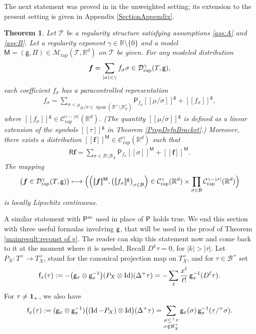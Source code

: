 \documentclass[11pt]{article}
\numberwithin{equation}{section}
\newcommand\mto{\mathchoice{\longmapsto}{\mapsto}{\mapsto}{\mapsto}}
\DeclareMathOperator{\Span}{span}
\theoremstyle{plain}
\newtheorem{thm}{Theorem}
\theoremstyle{definition}
\DeclareMathOperator{\iden}{Id}
\newcommand{\Brac}[1]{[\![#1]\!]}
\newcommand{\bsf}{\boldsymbol{f}}
\newcommand{\rap}{\mathrm{rap}}
\newcommand{\reR}{\boldsymbol{\mathsf{R}}}
\newcommand{\sfM}{\mathsf{M}}
\newcommand{\sfP}{\mathsf{P}}
\newcommand{\sff}{\mathsf{f}}
\newcommand{\sfg}{\mathsf{g}}
\newcommand{\sfPi}{\mathsf{\Pi}}
\newcommand{\scrM}{\mathscr{M}}
\newcommand{\scrT}{\mathscr{T}}
\newcommand{\bbR}{\mathbb{R}}
\newcommand{\mcB}{\mathcal{B}}
\newcommand{\mcC}{\mathcal{C}}
\newcommand{\mcD}{\mathcal{D}}
\begin{document}
The next statement was proved in \cite[Th.\,14]{BH} in the unweighted setting; its extension to the present setting is given in Appendix \ref{SectionAppendix}.

\begin{thm} \label{thm:MD to PD}
Let $\scrT$ be a regularity structure satisfying assumptions \eqref{ass:A} and \eqref{ass:B}. Let a regularity exponent $\gamma\in\bbR\setminus\{0\}$ and a model $\sfM=(\sfg,\sfPi)\in\scrM_\rap(\scrT,\bbR^d)$ on $\scrT$ be given. For any modeled distribution
\[
\bsf=\sum_{|\sigma|<\gamma}f_\sigma\sigma\in\mcD_\rap^\gamma(T,\sf g),
\]
each coefficient $f_\sigma$ has a paracontrolled representation
\begin{align}\label{eq:para system}
f_\sigma = \underset{\mu/\sigma\in\Span(\mcB^+\setminus\mcB_X^+)}{\sum_{\sigma<\mu}} \sfP_{f_\mu}\Brac{\mu/\sigma}^\sfg + \Brac{f_\sigma}^\sfg,
\end{align}
where $\Brac{f_\sigma}^\sfg\in \mcC_\rap^{\gamma-|\sigma|}(\bbR^d)$. (The quantity $\Brac{\mu/\sigma}^{\sfg}$ is defined as a linear extension of the symbols $\Brac{\tau}^{\sfg}$ in Theorem \ref{PropDefnBracket}.) Moreover, there exists a distribution $\Brac{\bsf}^\sfM\in \mcC_\rap^\gamma(\bbR^d)$ such that
\begin{align}\label{eq:para reconst}
\reR\bsf=\sum_{\sigma\in\mcB\setminus\mcB_{\underline{X}}} \sfP_{f_\sigma}\Brac{\sigma}^\sfM+\Brac{\bsf}^\sfM.
\end{align}
The mapping
\[
\bigl(\bsf\in\mcD_\rap^\gamma(T,{\sf g})\bigr)\mto \Bigl( \Bigl(\Brac{\bsf}^\sfM,\bigl(\Brac{f_\sigma}^\sfg\bigr)_{\sigma\in\mcB}\Bigr) \in \mcC^\gamma_\rap(\bbR^d)\times\prod_{\sigma\in\mcB} \mcC^{\gamma-\vert\sigma\vert}_\rap(\bbR^d) \Bigr)
\]
is locally Lipschitz continuous.
\end{thm}

A similar statement with ${\sf P}^m$ used in place of $\sf P$ holds true. We end this section with three useful formulas involving $\sf g$, that will be used in the proof of Theorem \ref{mainresult:reconst of g}. The reader can skip this statement now and come back to it at the moment where it is needed. Recall $D^k\tau=0$, for $\vert k\vert>\vert\tau\vert$. Let $P_X: T^+\to T^+_X$, stand for the canonical projection map on $T^+_X$, and for $\tau\in\mcB^+$ set
\begin{equation*}
\sff_x(\tau) := - \bigl({\sf g}_x\otimes {\sf g}_x^{-1}\bigr)(P_X\otimes\iden)(\Delta^+\tau) 
 = - \sum_{\ell}\frac{x^\ell}{\ell!} \, \sfg_x^{-1}(D^\ell\tau).
\end{equation*}
For $\tau\neq {\bf 1}_+$, we also have
\begin{equation*}
\sff_x(\tau) := ({\sf g}_x\otimes {\sf g}_x^{-1}) \bigl((\iden-P_X)\otimes\iden\bigr)
(\Delta^+\tau) = \sum_{\substack{\sigma\leq^+\tau\\\sigma\notin\mcB_X^+}} \sfg_x(\sigma)\,\sfg_x^{-1}(\tau/^+\sigma).
\end{equation*}
\end{document}
